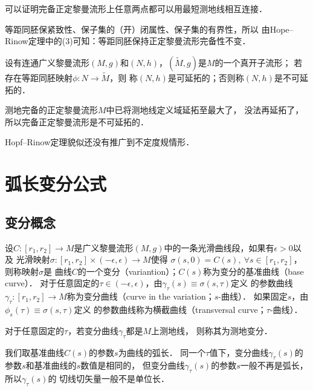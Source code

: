 可以证明\cite[\S 3.6]{chen-li-2023-2ed-v1}完备正定黎曼流形上任意两点都可以用最短测地线相互连接．

等距同胚保紧致性、保子集的（开）闭属性、保子集的有界性，所以
由Hope--Rinow定理中的(3)可知：等距同胚保持正定黎曼流形完备性不变．

\begin{definition}\label{chgd:def_extensible}
    设有连通广义黎曼流形$(M,g)$和$(N,h)$，$(\widetilde{M},g)$是$M$的一个真开子流形；
    若存在等距同胚映射$\phi:N\to \widetilde{M}$，则
    称$(N,h)$是{\heiti 可延拓的}；否则称$(N,h)$是{\heiti 不可延拓的}．
\end{definition}

测地完备的正定黎曼流形$M$中已将测地线定义域延拓至最大了，
没法再延拓了，所以完备正定黎曼流形是不可延拓的．


Hopf--Rinow定理貌似还没有推广到不定度规情形．

\section{弧长变分公式}


\subsection{变分概念}\label{chgd:sec_arc-variation}
\begin{definition}\label{chgd:def_arc-variation}
    设$C:[r_1,r_2]\to M$是广义黎曼流形$(M,g)$中的一条光滑曲线段，如果有$\epsilon > 0$以及
    光滑映射$\sigma:[r_1,r_2]\times (-\epsilon, \epsilon) \to M$使得
    $\sigma(s,0)=C(s),\ \forall s\in [r_1,r_2]$，则称映射$\sigma$是
    曲线$C$的一个{\heiti 变分}（variantion）；$C(s)$称为变分的{\heiti 基准曲线}（base curve）．
    对于任意固定的$\tau \in(-\epsilon, \epsilon) $，由$\gamma_\tau(s)\equiv \sigma(s,\tau)$定义
    的参数曲线$\gamma_\tau : [r_1,r_2]\to M$称为{\heiti 变分曲线}（curve in the variation；$s$-曲线）．
    如果固定$s$，由$\phi_s(\tau)\equiv \sigma(s,\tau)$定义
    的参数曲线称为{\heiti 横截曲线}（transversal curve；$\tau$-曲线）．
\end{definition}

对于任意固定的$\tau$，若变分曲线$\gamma_\tau$都是$M$上测地线，
则称其为{\heiti 测地变分}． 

\begin{remark}\label{chgd:remk_cs}
    我们取基准曲线$C(s)$的参数$s$为曲线的弧长．
    同一个$\tau$值下，变分曲线$\gamma_\tau(s)$的参数$s$和基准曲线的$s$数值是相同的，
    但变分曲线$\gamma_\tau(s)$的参数$s$一般不再是弧长，所以$\gamma_\tau(s)$的
    切线切矢量一般不是单位长．
\end{remark}


